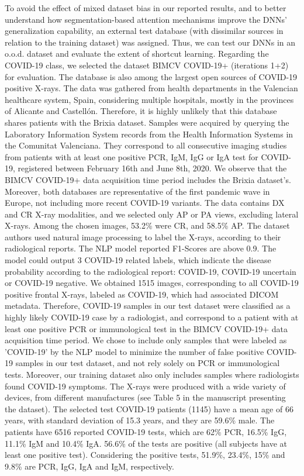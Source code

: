 \documentclass[fleqn,10pt]{wlscirep}
\begin{document}
{To avoid the effect of mixed dataset bias in our reported results, and to better understand how segmentation-based attention mechanisms improve the DNNs' generalization capability, an external test database (with dissimilar sources in relation to the training dataset) was assigned. Thus, we can test our DNNs in an o.o.d. dataset and evaluate the extent of shortcut learning. Regarding the COVID-19 class, we selected the dataset BIMCV COVID-19+ (iterations 1+2)\cite{BimcvSet} for evaluation. The database is also among the largest open sources of COVID-19 positive X-rays. The data was gathered from health departments in the Valencian healthcare system, Spain, considering multiple hospitals, mostly in the provinces of Alicante and Castellón\cite{BimcvSet}. Therefore, it is highly unlikely that this database shares patients with the Brixia dataset\cite{BrixiaSet}. Samples were acquired by querying the Laboratory Information System records from the Health Information Systems in the Comunitat Valenciana. They correspond to all consecutive imaging studies from patients with at least one positive PCR, IgM, IgG or IgA test for COVID-19, registered between February 16th and June 8th, 2020. We observe that the BIMCV COVID-19+ data acquisition time period includes the Brixia dataset's. Moreover, both databases are representative of the first pandemic wave in Europe, not including more recent COVID-19 variants. The data contains DX and CR X-ray modalities, and we selected only AP or PA views, excluding lateral X-rays. Among the chosen images, 53.2\% were CR, and 58.5\% AP. The dataset authors used natural image processing to label the X-rays, according to their radiological reports. The NLP model reported F1-Scores are above 0.9\cite{BimcvSet}. The model could output 3 COVID-19 related labels, which indicate the disease probability according to the radiological report: COVID-19, COVID-19 uncertain or COVID-19 negative. We obtained 1515 images, corresponding to all COVID-19 positive frontal X-rays, labeled as COVID-19, which had associated DICOM metadata. Therefore, COVID-19 samples in our test dataset were classified as a highly likely COVID-19 case by a radiologist, and correspond to a patient with at least one positive PCR or immunological test in the BIMCV COVID-19+ data acquisition time period. We chose to include only samples that were labeled as 'COVID-19' by the NLP model to minimize the number of false positive COVID-19 samples in our test dataset, and not rely solely on PCR or immunological tests. Moreover, our training dataset also only includes samples where radiologists found COVID-19 symptoms. The X-rays were produced with a wide variety of devices, from different manufactures (see Table 5 in the manuscript presenting the dataset\cite{BimcvSet}). The selected test COVID-19 patients (1145) have a mean age of 66 years, with standard deviation of 15.3 years, and they are 59.6\% male. The patients have 6516 reported COVID-19 tests, which are 62\% PCR, 16.5\% IgG, 11.1\% IgM and 10.4\% IgA. 56.6\% of the tests are positive (all subjects have at least one positive test). Considering the positive tests, 51.9\%, 23.4\%, 15\% and 9.8\% are PCR, IgG, IgA and IgM, respectively.

}
\end{document}
